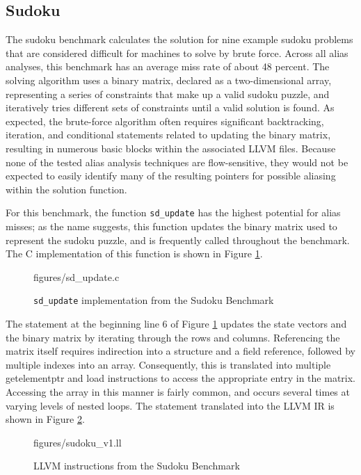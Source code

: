 \subsection{Sudoku}
The sudoku benchmark calculates the solution for nine example sudoku problems that are considered difficult for machines to solve by brute force. Across all alias analyses, this benchmark has an average miss rate of about 48 percent. The solving algorithm uses a binary matrix, declared as a two-dimensional array, representing a series of constraints that make up a valid sudoku puzzle, and iteratively tries different sets of constraints until a valid solution is found. As expected, the brute-force algorithm often requires significant backtracking, iteration, and conditional statements related to updating the binary matrix, resulting in numerous basic blocks within the associated LLVM files. Because none of the tested alias analysis techniques are flow-sensitive, they would not be expected to easily identify many of the resulting pointers for possible aliasing within the solution function.

For this benchmark, the function \texttt{sd\_update} has the highest potential for alias misses; as the name suggests, this function updates the binary matrix used to represent the sudoku puzzle, and is frequently called throughout the benchmark. The C implementation of this function is shown in Figure \ref{fig:sdc}.

\begin{figure} [h]
   {figures/sd_update.c}
  \caption{\texttt{sd\_update} implementation from the Sudoku Benchmark}
  \label{fig:sdc}
\end{figure}

The statement at the beginning line 6 of Figure \ref{fig:sdc} updates the state vectors and the binary matrix by iterating through the rows and columns. Referencing the matrix itself requires indirection into a structure and a field reference, followed by multiple indexes into an array. Consequently, this is translated into multiple getelementptr and load instructions to access the appropriate entry in the matrix. Accessing the array in this manner is fairly common, and occurs several times at varying levels of nested loops. The statement translated into the LLVM IR is shown in Figure \ref{fig:sdll}.

\begin{figure} [h]
   {figures/sudoku_v1.ll}
  \caption{LLVM instructions from the Sudoku Benchmark}
  \label{fig:sdll}
\end{figure}

